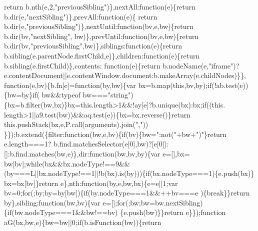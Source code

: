 \begin{DoxyCode}
{      return} b.nth(e,2,\textcolor{stringliteral}{"previousSibling"})\},nextAll:\textcolor{keyword}{function}(e)\{\textcolor{keywordflow}{return} b.dir(e,\textcolor{stringliteral}{"nextSibling"})\},prevAll:\textcolor{keyword}{function}(e)\{\textcolor{keywordflow}{
      return} b.dir(e,\textcolor{stringliteral}{"previousSibling"})\},nextUntil:\textcolor{keyword}{function}(bv,e,bw)\{\textcolor{keywordflow}{return} b.dir(bv,\textcolor{stringliteral}{"nextSibling"},
      bw)\},prevUntil:\textcolor{keyword}{function}(bv,e,bw)\{\textcolor{keywordflow}{return} b.dir(bv,\textcolor{stringliteral}{"previousSibling"},bw)\},siblings:\textcolor{keyword}{function}(e)\{\textcolor{keywordflow}{return} 
      b.sibling(e.parentNode.firstChild,e)\},children:\textcolor{keyword}{function}(e)\{\textcolor{keywordflow}{return} b.sibling(e.firstChild)\},contents:\textcolor{keyword}{
      function}(e)\{\textcolor{keywordflow}{return} b.nodeName(e,\textcolor{stringliteral}{"iframe"})?e.contentDocument||e.contentWindow.document:b.makeArray(e.childNodes)\}\},\textcolor{keyword}{
      function}(e,bv)\{b.fn[e]=\textcolor{keyword}{function}(by,bw)\{var bx=b.map(\textcolor{keyword}{this},bv,by);\textcolor{keywordflow}{if}(!ab.test(e))\{bw=by\}\textcolor{keywordflow}{if}(
      bw&&typeof bw===\textcolor{stringliteral}{"string"})\{bx=b.filter(bw,bx)\}bx=this.length>1&&!ay[e]?b.unique(bx):bx;\textcolor{keywordflow}{if}((this.
      length>1||a9.test(bw))&&aq.test(e))\{bx=bx.reverse()\}\textcolor{keywordflow}{return} this.pushStack(bx,e,P.call(arguments).join(\textcolor{stringliteral}{","}))
      \}\});b.extend(\{filter:\textcolor{keyword}{function}(bw,e,bv)\{\textcolor{keywordflow}{if}(bv)\{bw=\textcolor{stringliteral}{":not("}+bw+\textcolor{stringliteral}{")"}\}\textcolor{keywordflow}{return} e.length===1?
      b.find.matchesSelector(e[0],bw)?[e[0]]:[]:b.find.matches(bw,e)\},dir:\textcolor{keyword}{function}(bw,bv,by)\{var e=[],bx=
      bw[bv];\textcolor{keywordflow}{while}(bx&&bx.nodeType!==9&&(by===L||bx.nodeType!==1||!b(bx).is(by)))\{\textcolor{keywordflow}{if}(bx.nodeType===1)\{e.push(bx)\}
      bx=bx[bv]\}\textcolor{keywordflow}{return} e\},nth:\textcolor{keyword}{function}(by,e,bw,bx)\{e=e||1;var bv=0;\textcolor{keywordflow}{for}(;by;by=by[bw])\{\textcolor{keywordflow}{if}(by.nodeType===1&&++bv===e
      )\{\textcolor{keywordflow}{break}\}\}\textcolor{keywordflow}{return} by\},sibling:\textcolor{keyword}{function}(bw,bv)\{var e=[];\textcolor{keywordflow}{for}(;bw;bw=bw.nextSibling)\{\textcolor{keywordflow}{if}(bw.nodeType===1&&bw!==bv)
      \{e.push(bw)\}\}\textcolor{keywordflow}{return} e\}\});\textcolor{keyword}{function} aG(bx,bw,e)\{bw=bw||0;\textcolor{keywordflow}{if}(b.isFunction(bw))\{\textcolor{keywordflow}{return} 

\end{DoxyCode}
